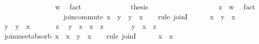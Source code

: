 \begin{isabellebody}
\isanewline
\ \ \ \ \ \ \ \ \ \ \isamarkupfalse%
\ \isamarkupfalse%
\ {\isachardoublequoteopen}{\isachardot}{\isachardot}{\isachardot}\ {\isasymsqsubseteq}\ w{\isachardoublequoteclose}\ \isamarkupfalse%
\ fact\isanewline
\ \ \ \ \ \ \ \ \ \ \isamarkupfalse%
\ \isamarkupfalse%
\ {\isacharquery}thesis\ \isacommand{{\isachardot}}\isamarkupfalse%
\isanewline
\ \ \ \ \ \ \ \ \isamarkupfalse%
\isanewline
\ \ \ \ \ \ \ \ \isamarkupfalse%
\ {\isachardoublequoteopen}z\ {\isasymsqsubseteq}\ w{\isachardoublequoteclose}\ \isamarkupfalse%
\ fact\isanewline
\ \ \ \ \ \ \isamarkupfalse%
\isanewline
\ \ \ \ \isamarkupfalse%
\isanewline
\ \ \isamarkupfalse%
\isanewline
\isanewline
\ \ \isamarkupfalse%
\ join{\isacharunderscore}commute{\isacharcolon}\ {\isachardoublequoteopen}x\ {\isasymsqunion}\ y\ {\isacharequal}\ y\ {\isasymsqunion}\ x{\isachardoublequoteclose}\isanewline
\ \ \isamarkupfalse%
\ {\isacharparenleft}rule\ joinI{\isacharparenright}\isanewline
\ \ \ \ \isamarkupfalse%
\ {\isachardoublequoteopen}x\ {\isasymsqsubseteq}\ y\ {\isasymsqunion}\ x{\isachardoublequoteclose}\ \isacommand{{\isachardot}{\isachardot}}\isamarkupfalse%
\isanewline
\ \ \ \ \isamarkupfalse%
\ {\isachardoublequoteopen}y\ {\isasymsqsubseteq}\ y\ {\isasymsqunion}\ x{\isachardoublequoteclose}\ \isacommand{{\isachardot}{\isachardot}}\isamarkupfalse%
\isanewline
\ \ \ \ \isamarkupfalse%
\ z\ \isamarkupfalse%
\ {\isachardoublequoteopen}y\ {\isasymsqsubseteq}\ z{\isachardoublequoteclose}\ \ {\isachardoublequoteopen}x\ {\isasymsqsubseteq}\ z{\isachardoublequoteclose}\isanewline
\ \ \ \ \isamarkupfalse%
\ \isamarkupfalse%
\ {\isachardoublequoteopen}y\ {\isasymsqunion}\ x\ {\isasymsqsubseteq}\ z{\isachardoublequoteclose}\ \isacommand{{\isachardot}{\isachardot}}\isamarkupfalse%
\isanewline
\ \ \isamarkupfalse%
\isanewline
\isanewline
\ \ \isamarkupfalse%
\ join{\isacharunderscore}meet{\isacharunderscore}absorb{\isacharcolon}\ {\isachardoublequoteopen}x\ {\isasymsqunion}\ {\isacharparenleft}x\ {\isasymsqinter}\ y{\isacharparenright}\ {\isacharequal}\ x{\isachardoublequoteclose}\isanewline
\ \ \isamarkupfalse%
\ {\isacharparenleft}rule\ joinI{\isacharparenright}\isanewline
\ \ \ \ \isamarkupfalse%
\ {\isachardoublequoteopen}x\ {\isasymsqsubseteq}\ x{\isachardoublequoteclose}\ \isacommand{{\isachardot}{\isachardot}}\isamarkupfalse%

\end{isabellebody}
